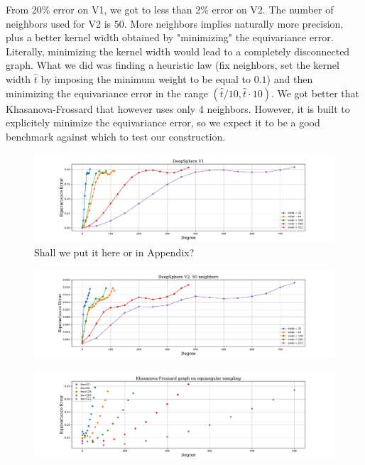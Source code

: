 \documentclass{article} %
\newcommand{\mart}[1]{{\color[rgb]{.9,.5,.3}{#1}}}
\begin{document}
From 20\% error on V1, we got to less than 2\% error on V2. The number of neighbors used for V2 is $50$. More neighbors implies naturally more precision, plus a better kernel width obtained by "minimizing" the equivariance error. \mart{How to explain how we found the kernel width? Micha\"el I need your help here!!} Literally, minimizing the kernel width would lead to a completely disconnected graph. What we did was finding a heuristic law (fix neighbors, set the kernel width $\hat t$ by imposing the minimum weight to be equal to $0.1$) and then minimizing the equivariance error in the range $(\hat t / 10, \hat t\cdot 10) $. We got better that Khasanova-Frossard \mart{(check the code)} that however uses only 4 neighbors. However, it is built to explicitely minimize the equivariance error, so we expect it to be a good benchmark against which to test our construction. 
\begin{figure}
	\centering
	\includegraphics[width=0.9\linewidth]{DeepSphereV1}
	\caption{Shall we put it here or in Appendix?
	}
	\label{fig:deepsphereV1}
\end{figure}

\begin{figure}
	\centering
	\includegraphics[width=0.9\linewidth]{DeepSphereV2_50neighbors.pdf}
	\caption{}
	\label{fig:deepsphereV2}
\end{figure}
\begin{figure}
	\centering
	\includegraphics[width=0.9\linewidth]{khasanova_frossard.pdf}
	\caption{}
	\label{fig:khasanova_frossard}
\end{figure}
\end{document}
